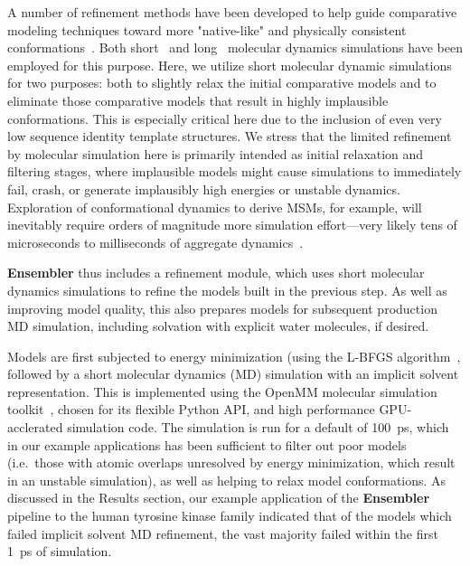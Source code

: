 \documentclass[aps,prl,preprint,nofootinbib,superscriptaddress,linenumbers]{revtex4-1}
\begin{document}
A number of refinement methods have been developed to help guide comparative modeling techniques toward more "native-like" and physically consistent conformations~\cite{maccallum:prot:2011:casp-refinement,zhang:curr-opin-struct-biol:2009:structure-prediction}.
Both short~\cite{zhang:curr-opin-struct-biol:2009:structure-prediction} and long~\cite{raval:prot:2012:long-timescale-md-refinement} molecular dynamics simulations have been employed for this purpose.
Here, we utilize short molecular dynamic simulations for two purposes: both to slightly relax the initial comparative models and to eliminate those comparative models that result in highly implausible conformations.
This is especially critical here due to the inclusion of even very low sequence identity template structures.
We stress that the limited refinement by molecular simulation here is primarily intended as initial relaxation and filtering stages, where implausible models might cause simulations to immediately fail, crash, or generate implausibly high energies or unstable dynamics.
Exploration of conformational dynamics to derive MSMs, for example, will inevitably require orders of magnitude more simulation effort---very likely tens of microseconds to milliseconds of aggregate dynamics~\cite{pande-beauchamp-bowman:2010:methods:markov-model-review,chodera-noe:curr-opin-struct-biol:2014:msm-review}.

{\bf Ensembler} thus includes a refinement module, which uses short molecular dynamics simulations to refine the models built in the previous step.
As well as improving model quality, this also prepares models for subsequent production MD simulation, including solvation with explicit water molecules, if desired.

Models are first subjected to energy minimization (using the L-BFGS algorithm~\cite{lbfgs}, followed by a short molecular dynamics (MD) simulation with an implicit solvent representation.
This is implemented using the OpenMM molecular simulation toolkit~\cite{eastman:jctc:2012:openmm}, chosen for its flexible Python API, and high performance GPU-acclerated simulation code.
The simulation is run for a default of 100~ps, which in our example applications has been sufficient to filter out poor models (i.e.~those with atomic overlaps unresolved by energy minimization, which result in an unstable simulation), as well as helping to relax model conformations.
As discussed in the Results section, our example application of the {\bf Ensembler} pipeline to the human tyrosine kinase family indicated that of the models which failed implicit solvent MD refinement, the vast majority failed within the first 1~ps of simulation.
\end{document}
